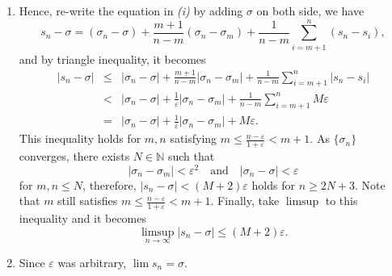 \documentclass[a4paper]{article}
\newcommand{\N}{\mathbb{N}}
\newcommand{\ve}{\varepsilon}
\theoremstyle{plain}
\begin{document}
\begin{enumerate}[label = (\alph*)]
\begin{enumerate}[label = (\roman*)]
            \item Hence, re-write the equation in {\it (i)} by adding $\sigma$ on both side,
                we have
                \[
                    s_n-\sigma=(\sigma_n-\sigma)+\frac{m+1}{n-m}(\sigma_n-\sigma_m)
                    +\frac{1}{n-m}\sum^n_{i=m+1}(s_n-s_i),
                \]
                and by triangle inequality, it becomes
                \[
                    \begin{array}{RCL}
                        \lvert s_n-\sigma\rvert & \leq & \lvert\sigma_n-\sigma\rvert
                        + \frac{m+1}{n-m}\lvert\sigma_n-\sigma_m\rvert
                        + \frac{1}{n-m}\sum^n_{i=m+1}\lvert s_n-s_i\rvert \\[4mm]
                        & < & \lvert\sigma_n-\sigma\rvert
                        + \frac{1}{\ve}\lvert\sigma_n-\sigma_m\rvert
                        + \frac{1}{n-m}\sum^n_{i=m+1}M\ve \\[4mm]
                        & = & \lvert\sigma_n-\sigma\rvert
                        + \frac{1}{\ve}\lvert\sigma_n-\sigma_m\rvert + M\ve.
                    \end{array}
                \]
                This inequality holds for $m,n$ satisfying $m\leq\frac{n-\ve}{1+\ve}<m+1$.
                As $\{\sigma_n\}$ converges, there exists $N\in\N$ such that
                \[
                    \lvert\sigma_n-\sigma_m\rvert < \ve^2
                    \quad \text{and} \quad
                    \lvert\sigma_n-\sigma\rvert < \ve
                \]
                for $m,n \leq N$, therefore, $\lvert s_n-\sigma\rvert < (M+2)\ve$
                holds for $n\geq 2N+3$. Note that $m$ still satisfies
                $m\leq\frac{n-\ve}{1+\ve}<m+1$. Finally, take $\limsup$ to this inequality
                and it becomes
                \[
                    \limsup_{n\to\infty}\lvert s_n-\sigma\rvert \leq (M+2)\ve.
                \]
                
            \item Since $\ve$ was arbitrary, $\lim s_n = \sigma$.
        \end{enumerate}
\end{enumerate}
\end{document}
